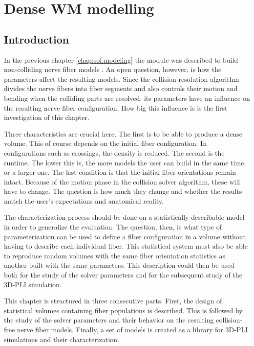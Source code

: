 \setcounter{chapter}{6}
\chapter{Dense \acs{WM} modelling}
\label{cha:model_analysis}
% 
\section{Introduction}
% 
In the previous chapter \cref{chap:sof:modeling} the module  was described to build non-colliding nerve fiber models \cite{Matuschke2019, Matuschke2021}.
An open question, however, is how the parameters affect the resulting models.
Since the collision resolution algorithm divides the nerve fibers into fiber segments and also controls their motion and bending when the colliding parts are resolved, its parameters have an influence on the resulting nerve fiber configuration.
How big this influence is is the first investigation of this chapter.
\par
% 
Three characteristics are crucial here.
The first is to be able to produce a dense volume.
This of course depends on the initial fiber configuration.
In configurations such as crossings, the density is reduced.
The second is the runtime.
The lower this is, the more models the user can build in the same time, or a larger one. 
The last condition is that the initial fiber orientations remain intact.
Because of the motion phase in the collision solver algorithm, these will have to change.
The question is how much they change and whether the results match the user's expectations and anatomical reality.
\par
% 
The characterization process should be done on a statistically describable model in order to generalize the evaluation. The question, then, is what type of parameterization can be used to define a fiber configuration in a volume without having to describe each individual fiber.
This statistical system must also be able to reproduce random volumes with the same fiber orientation statistics as another built with the same parameters.
This description could then be used both for the study of the solver parameters and for the subsequent study of the \ac{3D-PLI} simulation.
\par
% 
This chapter is structured in three consecutive parts.
First, the design of statistical volumes containing fiber populations is described.
This is followed by the study of the solver parameters and their behavior on the resulting collision-free nerve fiber models.
Finally, a set of models is created as a library for \ac{3D-PLI} simulations and their characterization.
% 
% 
% 
